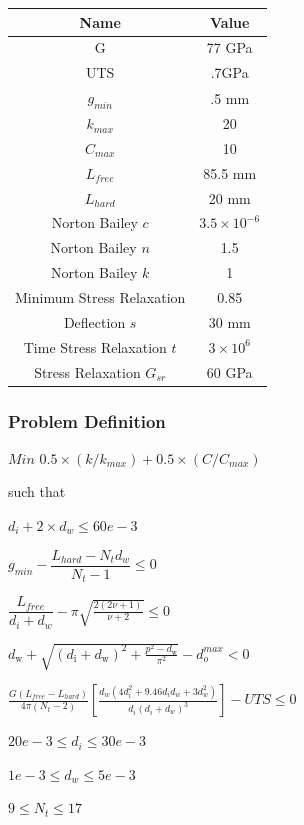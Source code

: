 \documentclass[10pt]{article}
\begin{document}
\begin{center}
	 \begin{tabular}{| c  | c |  }
	 	\hline Name & Value\\
	 	\hline G & 77 GPa \\
		\hline UTS & .7GPa \\
		\hline $g_{min}$ & .5 mm\\ 
	 	\hline $k_{max}$ & 20\\
		\hline $C_{max}$ & 10\\
		\hline $L_{free}$ & 85.5 mm\\
		\hline $L_{hard}$ & 20 mm\\
		\hline Norton Bailey $c$& $ 3.5 \times 10^{-6}$ \\
		\hline Norton Bailey $n$ & 1.5\\
		\hline Norton Bailey $k$ & 1 \\
		\hline Minimum Stress Relaxation & 0.85\\
		\hline Deflection $s$ & 30 mm\\
		\hline Time Stress Relaxation $t$  & $3 \times 10^{6}$\\
		\hline Stress Relaxation $G_{sr}$ & 60 GPa\\
		\hline
	 \end{tabular}
\end{center}

	\subsubsection{Problem Definition}
	
	\centerline{$Min$ \hspace{2 mm}$0.5 \times(k/k_{max}) + 0.5 \times (C/C_{max})$}
	\begin{center}such that \end{center}
	\centerline{$d_{i} + 2 \times d_{w} \leq 60e-3$}
	\centerline{$g_{min} - \dfrac{L_{hard} - N_{t}d_{w}}{N_{t}-1} \leq 0$}
	\centerline{$\dfrac{L_{free}}{d_{i} + d_{w}} - \pi \sqrt{\frac{2(2 \nu + 1)}{\nu + 2}} \leq 0$}
	\centerline{$d_{\text{w}} + \sqrt{(d_{\text{i}} + d_{\text{w}})^{2} + \frac{p^{2} - d_{\text{w}}}{\pi^{2}}} - d_{o}^{max} < 0$}
			
	\centerline{$\frac{G(L_{free} - L_{hard})}{4 \pi (N_{t} - 2) } \left[\frac{d_{w} (4d_{i}^{2} + 9.46d_{i} 
d_{w} + 3 d_{w}^{2})}{d_{i}(d_{i}+d_{w})^{3}}\right] - UTS \leq 0$}
    \centerline{$20e-3 \leq d_{i} \leq 30e-3$}
    \centerline{$1e-3 \leq d_{w} \leq 5e-3$}
    \centerline{$9 \leq N_{t} \leq 17$}
    
\end{document}
